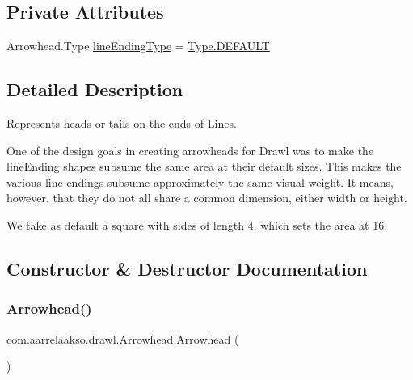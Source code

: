 \subsection*{Private Attributes}
\begin{DoxyCompactItemize}
\item 
Arrowhead.\+Type \hyperlink{classcom_1_1aarrelaakso_1_1drawl_1_1_arrowhead_a72183bdf6672377d73b2d9810b6d0ed7}{lineEnding\+Type} = \hyperlink{enumcom_1_1aarrelaakso_1_1drawl_1_1_arrowhead_1_1_type_ae4c70d3cd0853637fba791f2bb29cd8e}{Type.\+D\+E\+F\+A\+U\+LT}
\end{DoxyCompactItemize}


\subsection{Detailed Description}
Represents heads or tails on the ends of Lines. 

One of the design goals in creating arrowheads for Drawl was to make the lineEnding shapes subsume the same area at their default sizes. This makes the various line endings subsume approximately the same visual weight. It means, however, that they do not all share a common dimension, either width or height.

We take as default a square with sides of length 4, which sets the area at 16. 

\subsection{Constructor \& Destructor Documentation}
\mbox{\label{classcom_1_1aarrelaakso_1_1drawl_1_1_arrowhead_a866fb3900ad67226bad5962031cc7817}} 
\subsubsection{\texorpdfstring{Arrowhead()}{Arrowhead()}\hspace{0.1cm}{\footnotesize\ttfamily [1/2]}}
{\footnotesize\ttfamily com.\+aarrelaakso.\+drawl.\+Arrowhead.\+Arrowhead (\begin{DoxyParamCaption}{ }\end{DoxyParamCaption})}



